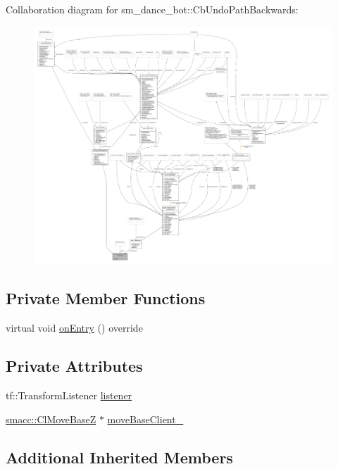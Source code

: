Collaboration diagram for sm\+\_\+dance\+\_\+bot\+:\+:Cb\+Undo\+Path\+Backwards\+:
\nopagebreak
\begin{figure}[H]
\begin{center}
\leavevmode
\includegraphics[width=350pt]{classsm__dance__bot_1_1CbUndoPathBackwards__coll__graph}
\end{center}
\end{figure}
\subsection*{Private Member Functions}
\begin{DoxyCompactItemize}
\item 
virtual void \hyperlink{classsm__dance__bot_1_1CbUndoPathBackwards_a5ecdf83df96ab3d74eb4e4febea7fa74}{on\+Entry} () override
\end{DoxyCompactItemize}
\subsection*{Private Attributes}
\begin{DoxyCompactItemize}
\item 
tf\+::\+Transform\+Listener \hyperlink{classsm__dance__bot_1_1CbUndoPathBackwards_a35aa53997f49c33d11a43cca81a72dfd}{listener}
\item 
\hyperlink{classsmacc_1_1ClMoveBaseZ}{smacc\+::\+Cl\+Move\+BaseZ} $\ast$ \hyperlink{classsm__dance__bot_1_1CbUndoPathBackwards_af79da57bfb5ecd6b20af32e44d4b9ca9}{move\+Base\+Client\+\_\+}
\end{DoxyCompactItemize}
\subsection*{Additional Inherited Members}



